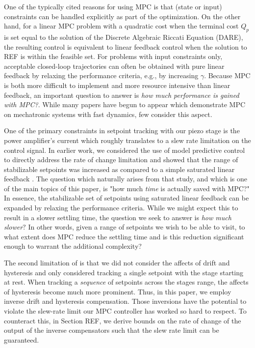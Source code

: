 \documentclass[journal,twocolumn,twoside]{IEEEtran}
\begin{document}
One of the typically cited reasons for using MPC is that (state or input) constraints can be handled explicitly as part of the optimization. On the other hand, for a linear MPC problem with a quadratic cost when the terminal cost $Q_p$ is set equal to the solution of the Discrete Algebraic Riccati Equation (DARE), the resulting control is equivalent to linear feedback control when the solution to REF is within the feasible set. For problems with input constraints only, acceptable closed-loop trajectories can often be obtained with pure linear feedback by relaxing the performance criteria, e.g., by increasing $\gamma$. Because MPC is both more difficult to implement and more resource intensive than linear feedback, an important question to answer is \emph{how much performance is gained with MPC?}. While many papers have begun to appear which demonstrate MPC on mechatronic systems with fast dynamics, few consider this aspect.

One of the primary constraints in setpoint tracking with our piezo stage is the power amplifier's current which roughly translates to a slew rate limitation on the control signal. In earlier work, we considered the use of model predictive control to directly address the rate of change limitation and showed that the range of stabilizable setpoints was increased as compared to a simple saturated linear feedback \cite{braker_application_2017}. The question which naturally arises from that study, and which is one of the main topics of this paper, is "how much \emph{time} is actually saved with MPC?" In essence, the stabilizable set of setpoints using saturated linear feedback can be expanded by relaxing the performance criteria. While we might expect this to result in a slower settling time, the question we seek to answer is \emph{how much slower}? In other words, given a range of setpoints we wish to be able to visit, to what extent does MPC reduce the settling time and is this reduction significant enough to warrant the additional complexity?

The second limitation of \cite{braker_application_2017} is that we did not consider the affects of drift and hysteresis and only considered tracking a single setpoint with the stage starting at rest. When tracking a \emph{sequence} of setpoints across the stages range, the affects of hysteresis become much more prominent. Thus, in this paper, we employ inverse drift and hysteresis compensation. Those inversions have the potential to violate the slew-rate limit our MPC controller has worked so hard to respect. To counteract this, in Section REF, we derive bounds on the rate of change of the output of the inverse compensators such that the slew rate limit can be guaranteed.
\end{document}
